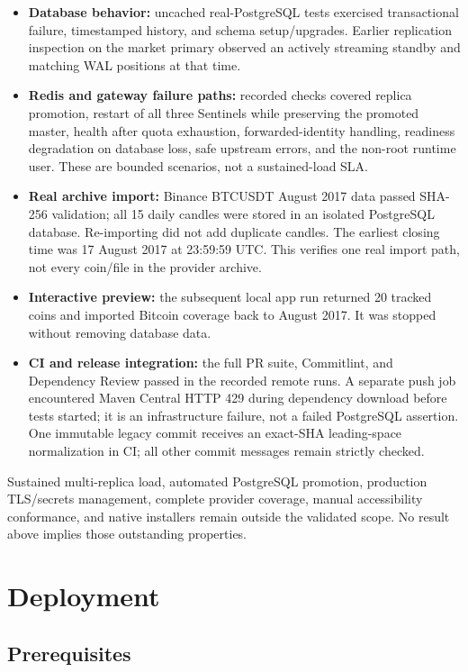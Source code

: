 \documentclass{scrartcl}
\begin{document}
\begin{itemize}
  \item \textbf{Database behavior:} uncached real-PostgreSQL tests exercised transactional
  failure, timestamped history, and schema setup/upgrades. Earlier replication inspection on the
  market primary observed an actively streaming standby and matching WAL positions at that time.
  \item \textbf{Redis and gateway failure paths:} recorded checks covered replica promotion,
  restart of all three Sentinels while preserving the promoted master, health after quota
  exhaustion, forwarded-identity handling, readiness degradation on database loss, safe upstream
  errors, and the non-root runtime user. These are bounded scenarios, not a sustained-load SLA.
  \item \textbf{Real archive import:} Binance BTCUSDT August 2017 data passed SHA-256 validation;
  all 15 daily candles were stored in an isolated PostgreSQL database. Re-importing did not add
  duplicate candles. The earliest closing time was 17 August 2017 at 23:59:59 UTC. This verifies
  one real import path, not every coin/file in the provider archive.
  \item \textbf{Interactive preview:} the subsequent local app run returned 20 tracked coins and
  imported Bitcoin coverage back to August 2017. It was stopped without removing database data.
  \item \textbf{CI and release integration:} the full PR suite, Commitlint, and Dependency Review
  passed in the recorded remote runs. A separate push job encountered Maven Central HTTP 429
  during dependency download before tests started; it is an infrastructure failure, not a failed
  PostgreSQL assertion. One immutable legacy commit receives an exact-SHA leading-space
  normalization in CI; all other commit messages remain strictly checked.
\end{itemize}

Sustained multi-replica load, automated PostgreSQL promotion, production TLS/secrets management,
complete provider coverage, manual accessibility conformance, and native installers remain
outside the validated scope. No result above implies those outstanding properties.

\section{Deployment}\label{deployment}

\subsection{Prerequisites}\label{deployment-prerequisites}
\end{document}
